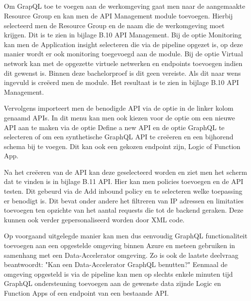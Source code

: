 \subsection{}%
\label{sec:Implementatie GraphQL}

Om GrapQL toe te voegen aan de werkomgeving gaat men naar de aangemaakte Resource Group en kan men de API Management module toevoegen.
Hierbij selecteerd men de Resource Group en de naam die de werkomgeving moet krijgen. Dit is te zien in bijlage B.10 API Management.
Bij de optie Monitoring kan men de Application insight selecteren die via de pipeline opgezet is, op deze manier wordt er ook monitoring toegevoegd aan de module. Bij de optie Virtual network kan met de opgezette virtuele netwerken en endpoints toevoegen indien dit gewenst is. Binnen deze bachelorproef is dit geen vereiste. Als dit naar wens ingevuld is creëerd men de module. Het resultaat is te zien in bijlage B.10 API Management.

Vervolgens importeert men de benodigde API via de optie in de linker kolom genaamd APIs. In dit menu kan men ook kiezen voor de optie om een nieuwe API aan te maken via de optie Define a new API en de optie GraphQL te selecteren of om een synthetische GraphQL API te creëeren en een bijhorend schema bij te voegen. Dit kan ook een gekozen endpoint zijn, Logic of Function App.

Na het creëeren van de API kan deze geselecteerd worden en ziet men het scherm dat te vinden is in bijlage B.11 API. Hier kan men policies toevoegen en de API testen. Dit gebeurd via de Add inbound policy en te selecteren welke toepassing er benodigt is. Dit bevat onder andere het filtreren van IP adressen en limitaties toevoegen ten opzichte van het aantal requests die tot de backend geraken. Deze kunnen ook verder gepersonaliseerd worden door XML code.

Op voorgaand uitgelegde manier kan men dus eenvoudig GraphQL functionaliteit toevoegen aan een opgestelde omgeving binnen Azure en meteen gebruiken in samenhang met een Data-Accelerator omgeving. Zo is ook de laatste deelvraag beantwoordt: "Kan een Data-Accelerator GraphQL benutten?" Eenmaal de omgeving opgesteld is via de pipeline kan men op slechts enkele minuten tijd GraphQL ondersteuning toevoegen aan de gewenste data zijnde Logic en Function Apps of een endpoint van een bestaande API.




